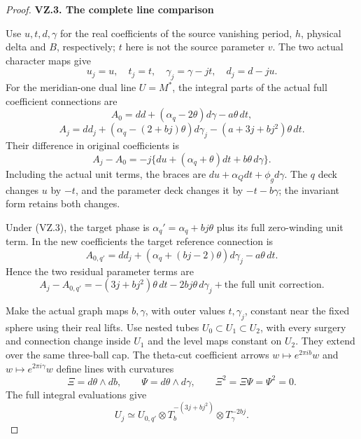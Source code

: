 \begin{proof}
\medskip\noindent\textbf{VZ.3. The complete line comparison}

\par\nobreak

Use \(u,t,d,\gamma\) for the real coefficients of the source vanishing
period, \(h\), physical delta and \(B\), respectively; \(t\) here is not
the source parameter \(v\). The two actual character maps give
\[
 u_j=u,\quad t_j=t,\quad\gamma_j=\gamma-jt,\quad d_j=d-ju.
                                                               \tag{VZ.9}
\]
For the meridian-one dual line \(U=M^*\), the integral parts of the
actual full coefficient connections are
\[
 A_0=dd+(\alpha_q-2\theta)d\gamma-a\theta\,dt,
\]
\[
 A_j=dd_j+(\alpha_q-(2+bj)\theta)d\gamma_j
                     -(a+3j+bj^2)\theta\,dt.        \tag{VZ.10}
\]
Their difference in original coefficients is
\[
 A_j-A_0=-j\{du+(\alpha_q+\theta)dt+b\theta\,d\gamma\}.
                                                               \tag{VZ.11}
\]
Including the actual unit terms, the braces are
\(du+\alpha_Qdt+\phi_gd\gamma\). The \(q\) deck changes \(u\) by
\(-t\), and the parameter deck changes it by \(-t-b\gamma\);
the invariant form retains both changes.

Under (VZ.3), the target phase is
\(\alpha_q'=\alpha_q+bj\theta\) plus its full zero-winding unit term.
In the new coefficients the target reference connection is
\[
 A_{0,q'}=dd_j+(\alpha_q+(bj-2)\theta)d\gamma_j-a\theta\,dt.
\]
Hence the two residual parameter terms are
\[
 A_j-A_{0,q'}=-(3j+bj^2)\theta\,dt-2bj\theta\,d\gamma_j
                    +\text{the full unit correction}.          \tag{VZ.12}
\]

Make the actual graph maps \(b,\gamma\), with outer values \(t,\gamma_j\),
constant near the fixed sphere using their real lifts. Use nested tubes
\(U_0\subset U_1\subset U_2\), with every surgery and connection change
inside \(U_1\) and the level maps constant on \(U_2\). They extend over
the same three-ball cap. The theta-cut coefficient arrows
\(w\mapsto e^{2\pi ib}w\) and \(w\mapsto e^{2\pi i\gamma}w\)
define lines with curvatures
\[
 \Xi=d\theta\wedge db,\qquad \Psi=d\theta\wedge d\gamma,\qquad
 \Xi^2=\Xi\Psi=\Psi^2=0.                              \tag{VZ.13}
\]
The full integral evaluations give
\[
 U_j\simeq U_{0,q'}\otimes
 T_b^{-(3j+bj^2)}\otimes T_\gamma^{-2bj}.              \tag{VZ.14}
\]


\end{proof}
